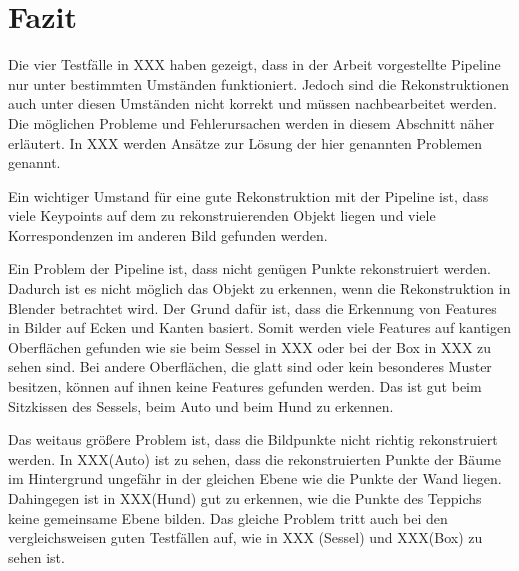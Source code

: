 
\chapter{Fazit}
\label{sec:conclusion}

Die vier Testfälle in XXX haben gezeigt, dass in der Arbeit vorgestellte Pipeline nur unter bestimmten Umständen funktioniert.
Jedoch sind die Rekonstruktionen auch unter diesen Umständen nicht korrekt und müssen nachbearbeitet werden.
Die möglichen Probleme und Fehlerursachen werden in diesem Abschnitt näher erläutert.
In XXX werden Ansätze zur Lösung der hier genannten Problemen genannt.

Ein wichtiger Umstand für eine gute Rekonstruktion mit der Pipeline ist, dass viele Keypoints auf dem zu rekonstruierenden Objekt liegen und viele Korrespondenzen im anderen Bild gefunden werden.

Ein Problem der Pipeline ist, dass nicht genügen Punkte rekonstruiert werden.
Dadurch ist es nicht möglich das Objekt zu erkennen, wenn die Rekonstruktion in Blender betrachtet wird.
Der Grund dafür ist, dass die Erkennung von Features in Bilder auf Ecken und Kanten basiert.
Somit werden viele Features auf kantigen Oberflächen gefunden wie sie beim Sessel in XXX oder bei der Box in XXX zu sehen sind.
Bei andere Oberflächen, die glatt sind oder kein besonderes Muster besitzen, können auf ihnen keine Features gefunden werden.
Das ist gut beim Sitzkissen des Sessels, beim Auto und beim Hund zu erkennen. 

Das weitaus größere Problem ist, dass die Bildpunkte nicht richtig rekonstruiert werden.
In XXX(Auto) ist zu sehen, dass die rekonstruierten Punkte der Bäume im Hintergrund ungefähr in der gleichen Ebene wie die Punkte der Wand liegen.  
Dahingegen ist in XXX(Hund) gut zu erkennen, wie die Punkte des Teppichs keine gemeinsame Ebene bilden.
Das gleiche Problem tritt auch bei den vergleichsweisen guten Testfällen auf, wie in XXX (Sessel) und XXX(Box) zu sehen ist.

